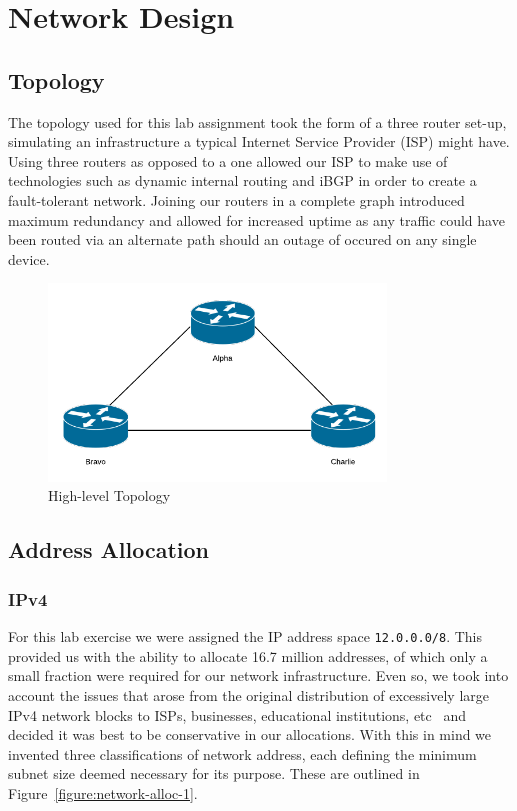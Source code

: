 \chapter{Network Design}

\section{Topology}

The topology used for this lab assignment took the form of a three router set-up,
simulating an infrastructure a typical Internet Service Provider (ISP)
might have. Using three routers as opposed to a one allowed our ISP to make use
of technologies such as dynamic internal routing and iBGP in order to create a
fault-tolerant network. Joining our routers in a complete graph introduced
maximum redundancy and allowed for increased uptime as any traffic could have
been routed via an alternate path should an outage of occured on any single
device.

\begin{figure}[!ht]
    \caption{High-level Topology}
    \centering
    \includegraphics[width=0.8\textwidth]{images/networkTopology.png}
\end{figure}

\section{Address Allocation}
\subsection{IPv4}
For this lab exercise we were assigned the IP address space
\texttt{12.0.0.0/8}. This provided us with the ability to allocate 16.7 million
addresses, of which only a small fraction were required for our network
infrastructure. Even so, we took into account the issues that arose from the
original distribution of excessively large IPv4 network blocks to ISPs,
businesses, educational institutions, etc~\cite{ipv4alloc}\cite{internetmap}
and decided it was best to be conservative in our allocations. With this in
mind we invented three classifications of network address, each defining the
minimum subnet size deemed necessary for its purpose. These are outlined in
Figure~\ref{figure:network-alloc-1}.

